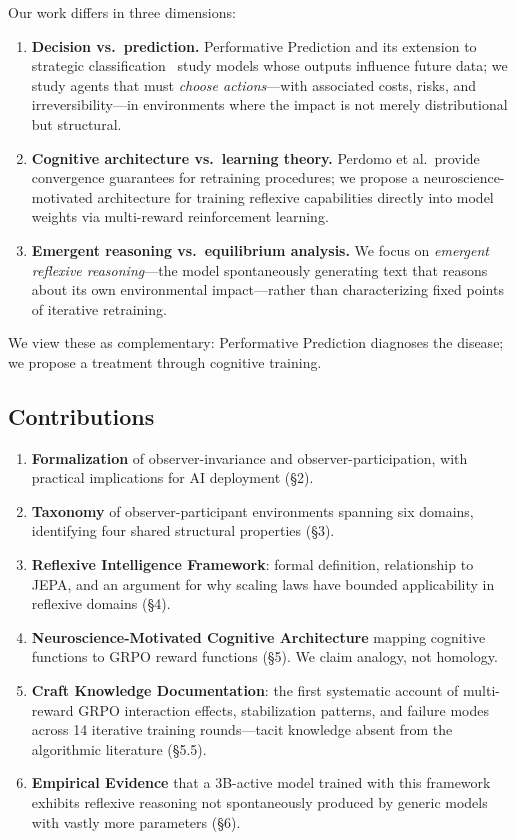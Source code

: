 \documentclass[11pt,a4paper]{article}
\begin{document}
Our work differs in three dimensions:

\begin{enumerate}[leftmargin=*]
\item \textbf{Decision vs.\ prediction.} Performative Prediction and its extension to strategic classification~\citep{hardt2016} study models whose outputs influence future data; we study agents that must \textit{choose actions}---with associated costs, risks, and irreversibility---in environments where the impact is not merely distributional but structural.
\item \textbf{Cognitive architecture vs.\ learning theory.} Perdomo et al.\ provide convergence guarantees for retraining procedures; we propose a neuroscience-motivated architecture for training reflexive capabilities directly into model weights via multi-reward reinforcement learning.
\item \textbf{Emergent reasoning vs.\ equilibrium analysis.} We focus on \textit{emergent reflexive reasoning}---the model spontaneously generating text that reasons about its own environmental impact---rather than characterizing fixed points of iterative retraining.
\end{enumerate}

We view these as complementary: Performative Prediction diagnoses the disease; we propose a treatment through cognitive training.

\subsection{Contributions}

\begin{enumerate}[leftmargin=*]
\item \textbf{Formalization} of observer-invariance and observer-participation, with practical implications for AI deployment (\S2).
\item \textbf{Taxonomy} of observer-participant environments spanning six domains, identifying four shared structural properties (\S3).
\item \textbf{Reflexive Intelligence Framework}: formal definition, relationship to JEPA, and an argument for why scaling laws have bounded applicability in reflexive domains (\S4).
\item \textbf{Neuroscience-Motivated Cognitive Architecture} mapping cognitive functions to GRPO reward functions (\S5). We claim analogy, not homology.
\item \textbf{Craft Knowledge Documentation}: the first systematic account of multi-reward GRPO interaction effects, stabilization patterns, and failure modes across 14 iterative training rounds---tacit knowledge absent from the algorithmic literature (\S5.5).
\item \textbf{Empirical Evidence} that a 3B-active model trained with this framework exhibits reflexive reasoning not spontaneously produced by generic models with vastly more parameters (\S6).
\end{enumerate}
\end{document}
